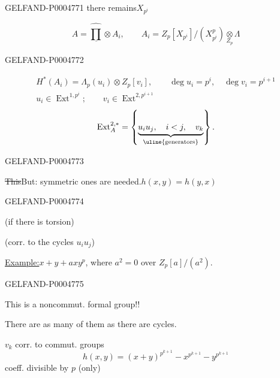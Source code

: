 \begin{GelfandAdjacentEvidence}{GELFAND-P000477}{1}
there remains\quad $X_{p^i}$

\[
\underline{A=\widehat{\prod}\otimes A_i},\qquad
A_i=Z_p[X_{p^i}]/(X_{p^i}^p)\underset{Z_p}{\otimes}\Lambda
\]
\end{GelfandAdjacentEvidence}
\begin{GelfandAdjacentEvidence}{GELFAND-P000477}{2}


\[
\begin{gathered}
H^*(A_i)=\Lambda_p(u_i)\otimes Z_p[v_i],\qquad
\deg u_i=p^i,\quad\deg v_i=p^{i+1}\\
u_i\in\operatorname{Ext}^{1,p^i};\qquad
v_i\in\operatorname{Ext}^{2,p^{i+1}}
\end{gathered}
\]
\[
\operatorname{Ext}_A^{2,*}=
\left\{\underbrace{u_i u_j,\quad i<j,\quad v_k}_{\text{\uline{generators}}}\right\}.
\]
\end{GelfandAdjacentEvidence}
\begin{GelfandAdjacentEvidence}{GELFAND-P000477}{3}


\sout{This}\quad But:
symmetric ones are needed.\quad \uline{\mbox{$h(x,y)=h(y,x)$}}
\end{GelfandAdjacentEvidence}
\begin{GelfandAdjacentEvidence}{GELFAND-P000477}{4}


\qquad (if there is torsion)

(corr. to the cycles $u_i u_j$)

\uline{Example:}\quad $x+y+axy^p$, where $a^2=0$ \quad
over $Z_p[a]/(a^2)$.
\end{GelfandAdjacentEvidence}
\begin{GelfandAdjacentEvidence}{GELFAND-P000477}{5}

This is a noncommut. formal group!!

There are as many of them as there are cycles.

$v_k$ corr. to commut. groups
\[
h(x,y)=(x+y)^{p^{k+1}}-x^{p^{k+1}}-y^{p^{k+1}}
\]
coeff. divisible by $p$ (only)
\end{GelfandAdjacentEvidence}
